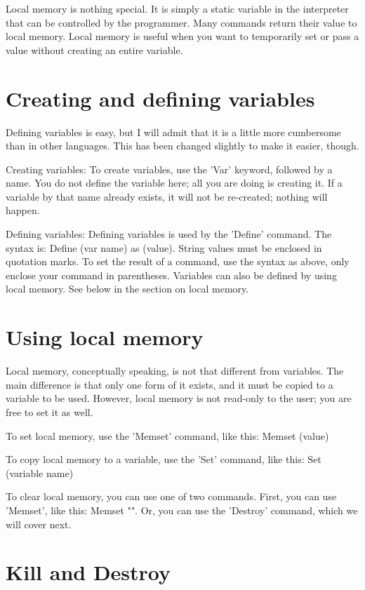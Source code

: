 \documentclass{report}
\begin{document}
Local memory is nothing special. It is simply a static variable in the interpreter that can be controlled by the programmer. Many commands return their value to local memory. Local memory is useful when you want to temporarily set or pass a value without creating an entire variable.

\section{Creating and defining variables}

Defining variables is easy, but I will admit that it is a little more cumbersome than in other languages. This has been changed slightly to make it easier, though.

Creating variables: To create variables, use the 'Var' keyword, followed by a name. You do not define the variable here; all you are doing is creating it. If a variable by that name already exists, it will not be re-created; nothing will happen.

Defining variables: Defining variables is used by the 'Define' command. The syntax is: Define (var name) as (value). String values must be enclosed in quotation marks. To set the result of a command, use the syntax as above, only enclose your command in parentheses. Variables can also be defined by using local memory. See below in the section on local memory.

\section{Using local memory}

Local memory, conceptually speaking, is not that different from variables. The main difference is that only one form of it exists, and it must be copied to a variable to be used. However, local memory is not read-only to the user; you are free to set it as well.

To set local memory, use the 'Memset' command, like this: Memset (value)

To copy local memory to a variable, use the 'Set' command, like this: Set (variable name)

To clear local memory, you can use one of two commands. First, you can use 'Memset', like this: Memset "". Or, you can use the 'Destroy' command, which we will cover next.

\section{Kill and Destroy}
\end{document}
